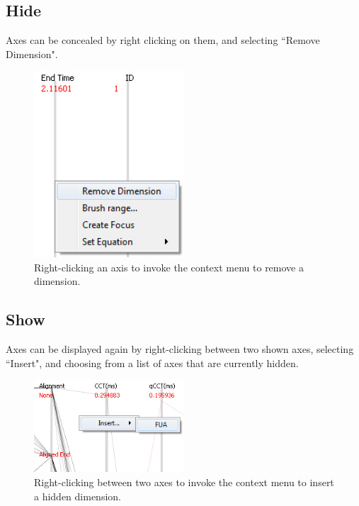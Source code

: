\documentclass[12pt]{ucthesis}
\begin{document}
\subsection{Hide}
Axes can be concealed by right clicking on them, and selecting ``Remove Dimension".
\begin{figure}[htb!]
 \centering
 \includegraphics[width=0.5\textwidth]{images/documentation/remove_dimension.jpg}
 \caption[Right-clicking an axis to remove a dimension.]{Right-clicking an axis to invoke the context menu to remove a dimension.}
 \label{fig:doc}
\end{figure}

\subsection{Show}
Axes can be displayed again by right-clicking between two shown axes, selecting ``Insert", and choosing from a list of axes that are currently hidden.
\begin{figure}[htb!]
 \centering
 \includegraphics[width=0.5\textwidth]{images/documentation/insert_dimension.jpg}
 \caption[Right-clicking between two axes to insert a hidden dimension.]{Right-clicking between two axes to invoke the context menu to insert a hidden dimension.}
 \label{fig:doc}
\end{figure}
\end{document}
